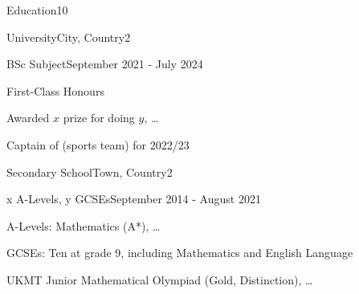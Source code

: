 \documentclass[10pt,a4paper]{CV}
\begin{document}
\selectfont


\begin{Section}{Education}{10}
    \begin{Institution}{University}{City, Country}{2}
        \begin{Position}{BSc Subject}{September 2021 - July 2024}
            \item First-Class Honours
            \item Awarded $x$ prize for doing $y$, \dots
            \item Captain of (sports team) for 2022/23
        \end{Position}
    \end{Institution}

    \begin{Institution}{Secondary School}{Town, Country}{2}
        \begin{Position}{x A-Levels, y GCSEs}{September 2014 - August 2021}
            \item A-Levels: Mathematics (A*), \dots
            \item GCSEs: Ten at grade 9, including Mathematics and English Language
            \item UKMT Junior Mathematical Olympiad (Gold, Distinction), \dots
        \end{Position}
    \end{Institution}
\end{Section}
\end{document}
